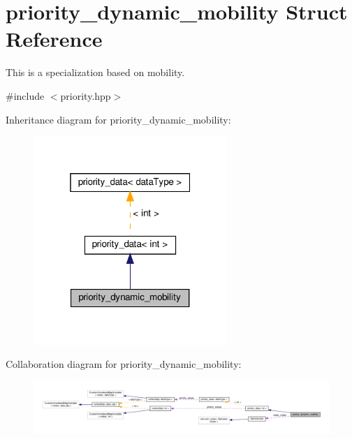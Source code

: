 \hypertarget{structpriority__dynamic__mobility}{}\section{priority\+\_\+dynamic\+\_\+mobility Struct Reference}
\label{structpriority__dynamic__mobility}


This is a specialization based on mobility.  




{\ttfamily \#include $<$priority.\+hpp$>$}



Inheritance diagram for priority\+\_\+dynamic\+\_\+mobility\+:
\nopagebreak
\begin{figure}[H]
\begin{center}
\leavevmode
\includegraphics[width=208pt]{d8/d1a/structpriority__dynamic__mobility__inherit__graph}
\end{center}
\end{figure}


Collaboration diagram for priority\+\_\+dynamic\+\_\+mobility\+:
\nopagebreak
\begin{figure}[H]
\begin{center}
\leavevmode
\includegraphics[width=350pt]{d8/da3/structpriority__dynamic__mobility__coll__graph}
\end{center}
\end{figure}
